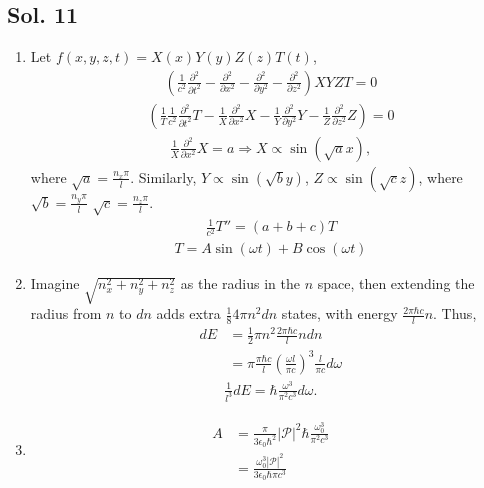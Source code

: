 \subsection*{Sol. 11}
\begin{enumerate}
    \item
          Let $f(x,y,z,t) = X(x)Y(y)Z(z)T(t)$,
          \begin{align*}
              \left(\frac{1}{c^2}\frac{\partial^2}{\partial t^2}
              -\frac{\partial^2}{\partial x^2}
              -\frac{\partial^2}{\partial y^2}
              -\frac{\partial^2}{\partial z^2}\right) XYZT = 0
          \end{align*}
          \begin{align*}
              \left(\frac{1}{T}\frac{1}{c^2}\frac{\partial^2}{\partial t^2}T
              -\frac{1}{X}\frac{\partial^2}{\partial x^2}X
              -\frac{1}{Y}\frac{\partial^2}{\partial y^2}Y
              -\frac{1}{Z}\frac{\partial^2}{\partial z^2}Z\right)  = 0
          \end{align*}
          \begin{align*}
              \frac{1}{X}\frac{\partial^2}{\partial x^2}X = a
              \Rightarrow X \propto\sin(\sqrt{a} x) ,
          \end{align*}
          where $\sqrt{a} = \frac{n_x\pi}{l}$. Similarly,
          $Y \propto \sin(\sqrt{b} y)$,
          $Z \propto \sin(\sqrt{c} z)$,
          where
          $\sqrt{b} = \frac{n_y\pi}{l}$
          $\sqrt{c} = \frac{n_z\pi}{l}$.
          \begin{align*}
              \frac{1}{c^2}T'' = (a+b + c)T
          \end{align*}
          \begin{align*}
              T = A\sin(\omega t) + B\cos(\omega t)
          \end{align*}
    \item
          Imagine $\sqrt{n_x^2+n_y^2+n_z^2}$ as the radius in the $n$ space, then extending the radius from $n$ to $dn$ adds extra $ \frac{1}{8}4\pi n^2 dn$ states, with energy $\frac{2\pi\hbar c}{l}n$.
          Thus,
          \begin{align*}
              d E & = \frac{1}{2}\pi n^2 \frac{2\pi\hbar c}{l}ndn \\
                  & =\pi  \frac{\pi\hbar c}{l}(\frac{\omega l}{\pi c})^3\frac{l}{\pi c}d\omega
          \end{align*}
          \begin{align*}
              \frac{1}{l^3}dE =
              \hbar\frac{\omega^3 }{\pi^2 c^3}d\omega.
          \end{align*}
    \item
          \begin{align*}
              A & =\frac{\pi}{3\epsilon_0\hbar^2}|\mathcal P|^2
              \hbar\frac{\omega_0^3 }{\pi^2 c^3} \\
                & =\frac{\omega_0^3|\mathcal P|^2}{3\epsilon_0\hbar \pi c^3}
          \end{align*}
\end{enumerate}
